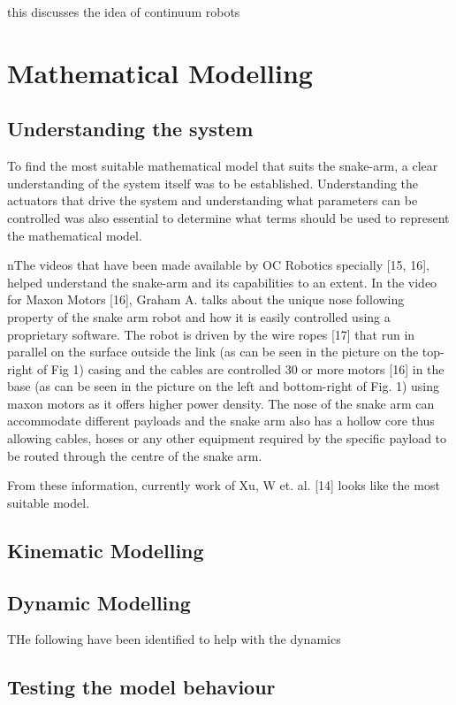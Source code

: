 \documentclass[a4paper,12pt]{report}
\begin{document}
\cite{singh2014continuum} this discusses the idea of continuum robots 



\chapter{Mathematical Modelling}
\section{Understanding the system}
To find the most suitable mathematical model that suits the snake-arm, a clear understanding of the system itself was to be established. Understanding the actuators that drive the system and understanding what parameters can be controlled was also essential to determine what terms should be used to represent the mathematical model.

nThe videos that have been made available by OC Robotics specially [15, 16], helped understand the snake-arm and its capabilities to an extent. In the video for Maxon Motors [16], Graham A. talks about the unique nose following property of the snake arm robot and how it is easily controlled using a proprietary software. The robot is driven by the wire ropes [17] that run in parallel on the surface outside the link (as can be seen in the picture on the top-right of Fig 1) casing and the cables are controlled 30 or more motors [16] in the base (as can be seen in the picture on the left and bottom-right of Fig. 1) using maxon motors as it offers higher power density. The nose of the snake arm can accommodate different payloads and the snake arm also has a hollow core thus allowing cables, hoses or any other equipment required by the specific payload to be routed through the centre of the snake arm.

From these information, currently work of Xu, W et. al. [14] looks like the most suitable model. 

\section{Kinematic Modelling}
\section{Dynamic Modelling}
THe following have been identified to help with the dynamics
\cite{mu_liu_xu_lou_liang_2019}
\section{Testing the model behaviour}
\end{document}
